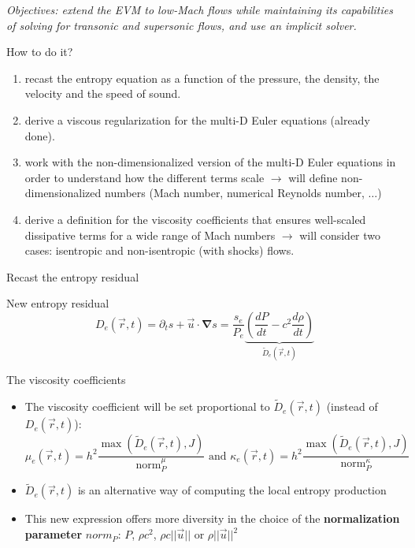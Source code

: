 \documentclass[xcolor=dvipsnames,10pt]{beamer}
\newcommand{\grad}{\boldsymbol{\nabla}}
\newcommand{\norm}{\textrm{norm}}
\begin{document}
\begin{frame}
\emph{Objectives: extend the EVM to low-Mach flows while maintaining its capabilities of solving for transonic and supersonic flows, and use an implicit solver.}
\begin{block}{How to do it?}
\begin{enumerate}
\setlength{\itemsep}{10pt}
\item recast the entropy equation as a function of the pressure, the density, the velocity and the speed of sound.
\item derive a viscous regularization for the multi-D Euler equations (already done).
\item work with the non-dimensionalized version of the multi-D Euler equations in order to understand how the different terms scale $\to$ will define non-dimensionalized numbers (Mach number, numerical Reynolds number, $\dots$)
\item derive a definition for the viscosity coefficients that ensures well-scaled dissipative terms for a wide range of Mach numbers $\to$ will consider two cases: isentropic and non-isentropic (with shocks) flows.
\end{enumerate}
\end{block}
\end{frame}
\begin{frame}{Recast the entropy residual}
\begin{block}{New entropy residual}
\begin{equation}
D_e(\vec{r},t) = \partial_t s + \vec{u} \cdot \grad s = \frac{s_e}{P_e} \underbrace{\left( \frac{d P}{dt} - c^2 \frac{d \rho}{dt} \right)}_{\tilde{D}_e(\vec{r},t)} \nonumber
\end{equation}
\end{block}
\begin{block}{The viscosity coefficients}
\begin{itemize}
\item The viscosity coefficient will be set proportional to $\tilde{D}_e(\vec{r},t)$ (instead of $D_e(\vec{r},t)$):
\begin{equation}
\mu_e(\vec{r},t) = h^2 \frac{\max \left( \tilde{D}_e(\vec{r},t), J \right)}{\norm_P^\mu} \text{ and }\kappa_e(\vec{r},t) = h^2 \frac{\max \left( \tilde{D}_e(\vec{r},t), J \right)}{\norm_P^\kappa} \nonumber
\end{equation}
\item $\tilde{D}_e(\vec{r},t)$ is an alternative way of computing the local entropy production
\item This new expression offers more diversity in the choice of the \textbf{normalization parameter} $norm_P$: $P$, $\rho c^2$, $\rho c ||\vec{u} ||$ or  $\rho ||\vec{u}||^2$
\end{itemize}
\end{block}
\end{frame}
\end{document}
